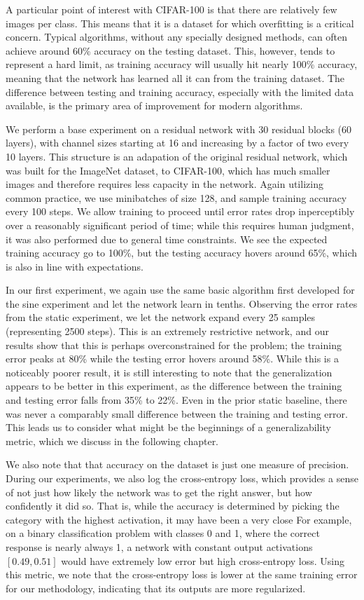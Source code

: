A particular point of interest with CIFAR-100 is that there are relatively few images per class.
This means that it is a dataset for which overfitting is a critical concern.
Typical algorithms, without any specially designed methods, can often achieve around 60\% accuracy on the testing dataset.
This, however, tends to represent a hard limit, as training accuracy will usually hit nearly 100\% accuracy, meaning that the network has learned all it can from the training dataset.
The difference between testing and training accuracy, especially with the limited data available, is the primary area of improvement for modern algorithms.

We perform a base experiment on a residual network with 30 residual blocks (60 layers), with channel sizes starting at 16 and increasing by a factor of two every 10 layers.
This structure is an adapation of the original residual network, which was built for the ImageNet dataset, to CIFAR-100, which has much smaller images and therefore requires less capacity in the network.
Again utilizing common practice, we use minibatches of size 128, and sample training accuracy every 100 steps.
We allow training to proceed until error rates drop inperceptibly over a reasonably significant period of time; while this requires human judgment, it was also performed due to general time constraints.
We see the expected training accuracy go to 100\%, but the testing accuracy hovers around 65\%, which is also in line with expectations.

In our first experiment, we again use the same basic algorithm first developed for the sine experiment and let the network learn in tenths.
Observing the error rates from the static experiment, we let the network expand every 25 samples (representing 2500 steps).
This is an extremely restrictive network, and our results show that this is perhaps overconstrained for the problem; the training error peaks at 80\% while the testing error hovers around 58\%.
While this is a noticeably poorer result, it is still interesting to note that the generalization appears to be better in this experiment, as the difference between the training and testing error falls from 35\% to 22\%.
Even in the prior static baseline, there was never a comparably small difference between the training and testing error.
This leads us to consider what might be the beginnings of a generalizability metric, which we discuss in the following chapter.

We also note that that accuracy on the dataset is just one measure of precision.
During our experiments, we also log the cross-entropy loss, which provides a sense of not just how likely the network was to get the right answer, but how confidently it did so.
That is, while the accuracy is determined by picking the category with the highest activation, it may have been a very close 
For example, on a binary classification problem with classes 0 and 1, where the correct response is nearly always 1, a network with constant output activations $[0.49, 0.51]$ would have extremely low error but high cross-entropy loss.
Using this metric, we note that the cross-entropy loss is lower at the same training error for our methodology, indicating that its outputs are more regularized.

